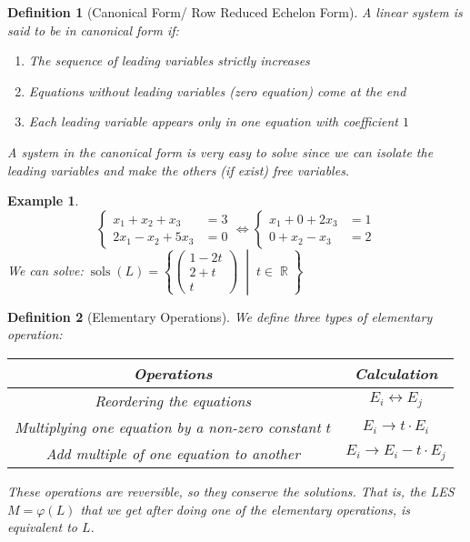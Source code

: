 \documentclass[12pt]{article}
\let\LR\Leftrightarrow
\newcommand{\set}[2]{\left\{{#1}\;\middle|\;{#2}\right\}}
\DeclareMathOperator{\R}{\mathbb{R}}
\DeclareMathOperator{\sols}{sols}
\newtheorem{definition}{Definition}[subsection]
\newtheorem{example}{Example}[subsection]
\begin{document}
\begin{definition} [Canonical Form/ Row Reduced Echelon Form]
  A linear system is said to be in canonical form if:
  \begin{enumerate}
    \item The sequence of leading variables strictly increases
    \item Equations without leading variables (zero equation) come at the end
    \item Each leading variable appears only in one equation with coefficient $1$
  \end{enumerate}
  A system in the canonical form is very easy to solve since we can isolate the leading variables and make the others (if exist) free variables.
\end{definition}

\begin{example}
  $$
  \begin{cases}
    x_1+x_2+x_3&=3\\
    2x_1-x_2+5x_3&=0
  \end{cases}
  \LR
  \begin{cases}
    x_1+0+2x_3&=1\\
    0+x_2-x_3&=2
  \end{cases}
  $$
  We can solve:$\;\sols(L)=\set{\begin{pmatrix}1-2t\\2+t\\t\end{pmatrix}}{t\in\R}$
\end{example}

\begin{definition}[Elementary Operations]
  We define three types of elementary operation:
  \begin{table}[H]
    \centering
    \begin{tabular}{|c|c|}\hline
      Operations & Calculation\\\hline
      Reordering the equations & $E_i\leftrightarrow E_j$\\\hline
      Multiplying one equation by a non-zero constant $t$ & $E_i\rightarrow t\cdot E_i$\\\hline
      Add multiple of one equation to another & $E_i\rightarrow E_i-t\cdot E_j$\\\hline
    \end{tabular}
  \end{table}

  These operations are reversible, so they conserve the solutions. That is, the LES $M=\varphi(L)$ that we get after doing one of the elementary operations, is equivalent to $L$.
\end{definition}
\end{document}
